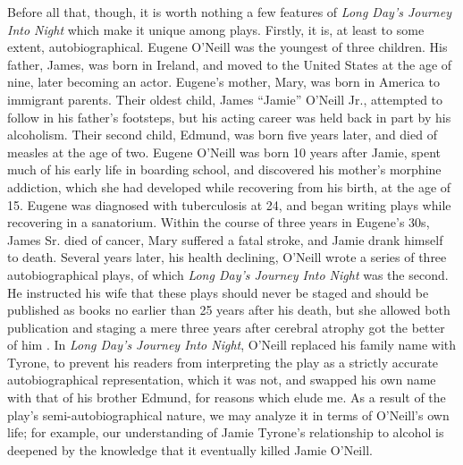 \documentclass[letterpaper, 12pt]{article}
\newcommand{\ldjin}{\textit{Long Day's Journey Into Night}}
\newcommand{\oneill}{O'Neill}
\begin{document}
Before all that, though, it is worth nothing a few features of \ldjin{} which
make it unique among plays. Firstly, it is, at least to some extent,
autobiographical. Eugene \oneill{} was the youngest of three children. His
father, James, was born in Ireland, and moved to the United States at the age
of nine, later becoming an actor. Eugene's mother, Mary, was born in America to
immigrant parents. Their oldest child, James \enquote{Jamie} \oneill{} Jr.,
attempted to follow in his father's footsteps, but his acting career was held
back in part by his alcoholism. Their second child, Edmund, was born five years
later, and died of measles at the age of two. Eugene \oneill{} was born 10
years after Jamie, spent much of his early life in boarding school, and
discovered his mother's morphine addiction, which she had developed while
recovering from his birth, at the age of 15. Eugene was diagnosed with
tuberculosis at 24, and began writing plays while recovering in a
sanatorium. Within the course of three years in Eugene's 30s, James Sr. died of
cancer, Mary suffered a fatal stroke, and Jamie drank himself to death. Several
years later, his health declining, \oneill{} wrote a series of three
autobiographical plays, of which \ldjin{} was the second. He instructed his
wife that these plays should never be staged and should be published as books
no earlier than 25 years after his death, but she allowed both publication and
staging a mere three years after cerebral atrophy got the better of him
\parencite[loc. 2826--2862]{timeline}. In \ldjin{}, \oneill{} replaced his
family name with Tyrone, to prevent his readers from interpreting the play as a
strictly accurate autobiographical representation, which it was not, and
swapped his own name with that of his brother Edmund, for reasons which elude
me. As a result of the play's semi-autobiographical nature, we may analyze it
in terms of \oneill{}'s own life; for example, our understanding of Jamie
Tyrone's relationship to alcohol is deepened by the knowledge that it
eventually killed Jamie \oneill{}.
\end{document}
